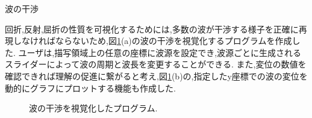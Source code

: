 \documentclass[a4j,twocolumn,uplatex]{jarticle}
\begin{document}
波の干渉

回折,反射,屈折の性質を可視化するためには,多数の波が干渉する様子を正確に再現しなければならないため,図\ref{fig:program1}(a)の波の干渉を視覚化するプログラムを作成した. ユーザは,描写領域上の任意の座標に波源を設定でき,波源ごとに生成されるスライダーによって波の周期と波長を変更することができる.
また,変位の数値を確認できれば理解の促進に繋がると考え,図\ref{fig:program1}(b)の,指定したy座標での波の変位を動的にグラフにプロットする機能も作成した.



\begin{figure}[H]
\caption{{\footnotesize 波の干渉を視覚化したプログラム.}}
\label{fig:program1}
\end{figure}
\vspace{-7mm}

\vspace{-5mm}
\end{document}

